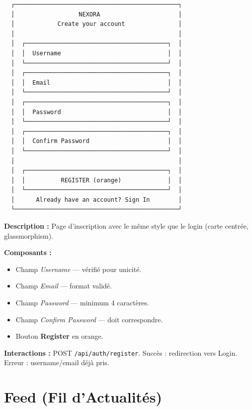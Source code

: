 \documentclass[12pt,a4paper]{article}
\begin{document}
\begin{verbatim}
  ┌──────────────────────────────────────────────┐
  │                  NEXORA                      │
  │            Create your account               │
  │                                              │
  │  ┌────────────────────────────────────────┐  │
  │  │  Username                              │  │
  │  └────────────────────────────────────────┘  │
  │  ┌────────────────────────────────────────┐  │
  │  │  Email                                 │  │
  │  └────────────────────────────────────────┘  │
  │  ┌────────────────────────────────────────┐  │
  │  │  Password                              │  │
  │  └────────────────────────────────────────┘  │
  │  ┌────────────────────────────────────────┐  │
  │  │  Confirm Password                      │  │
  │  └────────────────────────────────────────┘  │
  │                                              │
  │  ┌────────────────────────────────────────┐  │
  │  │          REGISTER (orange)             │  │
  │  └────────────────────────────────────────┘  │
  │      Already have an account? Sign In        │
  └──────────────────────────────────────────────┘
\end{verbatim}

\textbf{Description :} Page d'inscription avec le même style que le login (carte centrée, glassmorphism).

\textbf{Composants :}
\begin{itemize}
    \item Champ \textit{Username} — vérifié pour unicité.
    \item Champ \textit{Email} — format validé.
    \item Champ \textit{Password} — minimum 4 caractères.
    \item Champ \textit{Confirm Password} — doit correspondre.
    \item Bouton \textbf{Register} en orange.
\end{itemize}

\textbf{Interactions :} POST \texttt{/api/auth/register}. Succès : redirection vers Login. Erreur : username/email déjà pris.

\section{Feed (Fil d'Actualités)}
\end{document}
